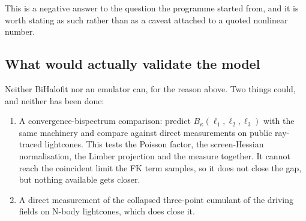 This is a negative answer to the question the programme started from, and
it is worth stating as such rather than as a caveat attached to a quoted
nonlinear number.

\subsection{What would actually validate the model}

Neither BiHalofit nor an emulator can, for the reason above. Two things
could, and neither has been done:

\begin{enumerate}
\item A convergence-bispectrum comparison: predict
$B_\kappa(\ell_1,\ell_2,\ell_3)$ with the same machinery and compare
against direct measurements on public ray-traced lightcones. This tests the
Poisson factor, the screen-Hessian normalisation, the Limber projection and
the measure together. It cannot reach the coincident limit the FK term
samples, so it does not close the gap, but nothing available gets closer.
\item A direct measurement of the collapsed three-point cumulant of the
driving fields on N-body lightcones, which does close it.
\end{enumerate}
